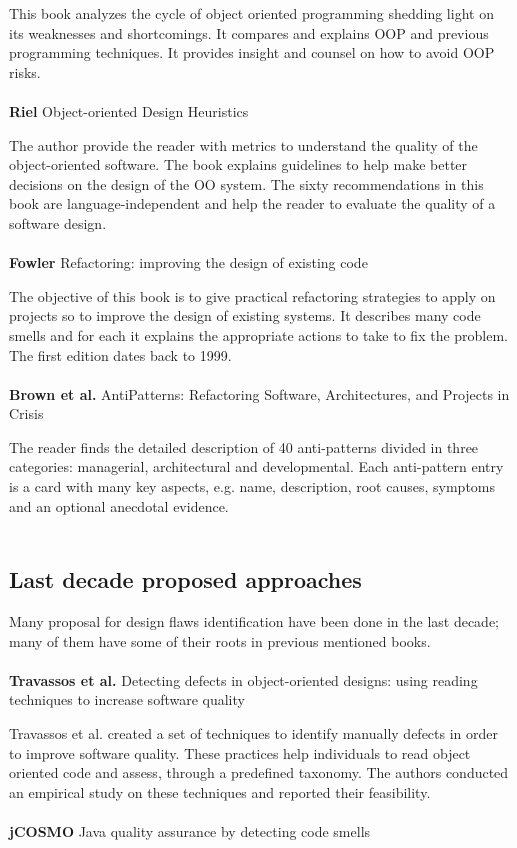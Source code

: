 This book analyzes the cycle of object oriented programming shedding light on its weaknesses and shortcomings. It compares and explains OOP and previous programming techniques. It provides insight and counsel on how to avoid OOP risks.
\\
\\
\textbf{Riel} \cite{riel1996object} Object-oriented Design Heuristics

The author provide the reader with metrics to understand the quality of the object-oriented software. The book explains guidelines to help make better decisions on the design of the OO system. 
The sixty recommendations in this book are language-independent and help the reader to evaluate the quality of a software design.
\\
\\
\textbf{Fowler} \cite{fowler2018refactoring} Refactoring: improving the design of existing code

The objective of this book is to give practical refactoring strategies to apply on projects so to improve the design of existing systems. It describes many code smells and for each it explains the appropriate actions to take to fix the problem. The first edition dates back to 1999.
\\
\\
\textbf{Brown et al.} \cite{brownantipatterns} AntiPatterns: Refactoring Software, Architectures, and Projects in Crisis

The reader finds the detailed description of 40 anti-patterns divided in three categories: managerial, architectural and developmental. 
Each anti-pattern entry is a card with many key aspects, e.g. name, description, root causes, symptoms and an optional anecdotal evidence.
\\
\\
\subsection{Last decade proposed approaches}
Many proposal for design flaws identification have been done in the last decade; many of them have some of their roots in previous mentioned books.
\\
\\
\textbf{Travassos et al.} \cite{travassos1999detecting} Detecting defects in object-oriented designs: using reading techniques to increase software quality

Travassos et al. created a set of techniques to identify manually defects in order to improve software quality. These practices help individuals to read object oriented code and assess, through a predefined taxonomy. The authors conducted an empirical study on these techniques and reported their feasibility.
\\
\\
\textbf{jCOSMO} \cite{van2002java} Java quality assurance by detecting code smells

